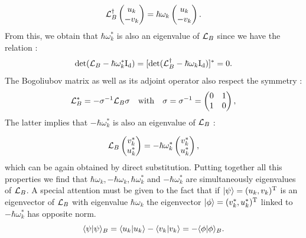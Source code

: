 \begin{equation}
    \mathcal{L}_B^\dagger \begin{pmatrix}
        u_k \\
        -v_k
    \end{pmatrix} = \hbar\omega_k \begin{pmatrix}
        u_k \\
        -v_k
    \end{pmatrix}.
\end{equation}
From this, we obtain that $\hbar\omega_k^*$ is also an eigenvalue of $\mathcal{L}_B$ since we have the relation :
\begin{equation}
    \mathrm{det}(\mathcal{L}_B-\hbar\omega_k^*\mathrm{I_d}) = [\mathrm{det}(\mathcal{L}_B^\dagger-\hbar\omega_k\mathrm{I_d})]^* = 0.
\end{equation}
The Bogoliubov matrix as well as its adjoint operator also respect the symmetry :
\begin{equation}
    \mathcal{L}_B^* = -\sigma^{-1} \mathcal{L}_B \sigma \ \ \ \mathrm{with} \ \ \ \sigma = \sigma^{-1} =\begin{pmatrix}
        0 & 1 \\
        1 & 0
    \end{pmatrix},
    \label{eq:symmetry_bog_2}
\end{equation}
The latter implies that $-\hbar\omega_k^*$ is also an eigenvalue of $\mathcal{L}_B$ :

\begin{equation}
    \mathcal{L}_B \begin{pmatrix}
        v_k^* \\
        u_k^*
    \end{pmatrix} = -\hbar\omega_k^* \begin{pmatrix}
        v_k^* \\
        u_k^*
    \end{pmatrix},
\end{equation}
which can be again obtained by direct substitution. Putting together all this properties we find that $\hbar \omega_k, -\hbar \omega_k, \hbar\omega_k^*$ and $-\hbar\omega_k^*$ are simultaneously eigenvalues of $\mathcal{L}_B$.
A special attention must be given to the fact that if $\ket{\psi}=(u_k,v_k)^\mathrm{T}$ is an eigenvector of $\mathcal{L}_B$ with eigenvalue $\hbar\omega_k$ the eigenvector $\ket{\phi}=(v_k^*,u_k^*)^\mathrm{T}$ linked to $-\hbar\omega_k^*$ has opposite norm.
\begin{equation}
    \langle \psi| \psi \rangle_B = \bra{u_k}\ket{u_k} - \bra{v_k}\ket{v_k} = -\langle \phi| \phi \rangle_B.
\end{equation}
\bigskip

